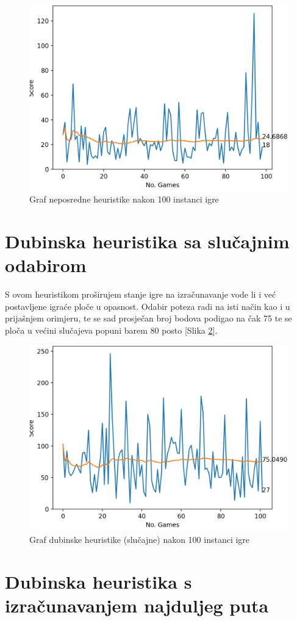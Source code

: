 \documentclass[zavrsnirad]{fer}
\begin{document}
\begin{figure}[htb]
	\centering
	\includegraphics[width=0.58\linewidth]{Figures/sofort.png} 
	\caption{Graf neposredne heuristike nakon 100 instanci igre}
	\label{slk:sofort_graph}
\end{figure}


\section{Dubinska heuristika sa slučajnim odabirom}
\label{pog:dubinska_slucajna}

S ovom heuristikom proširujem stanje igre na izračunavanje vode li i već postavljene igraće ploče u opasnost. Odabir poteza radi na isti način kao i u prijašnjem orimjeru, te se sad prosječan broj bodova podigao na čak 75 te se ploča u većini slučajeva popuni barem 80 posto [Slika \ref{slk:reach_graph}].

\begin{figure}[htb]
	\centering
	\includegraphics[width=0.58\linewidth]{Figures/reach.png} 
	\caption{Graf dubinske heuristike (slučajne) nakon 100 instanci igre}
	\label{slk:reach_graph}
\end{figure}


\section{Dubinska heuristika s izračunavanjem najduljeg puta}
\label{pog:dubinska}
\end{document}
